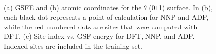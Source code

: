 \documentclass{article}
\begin{document}
\begin{figure}[H]%
\centering%
%
%
\\
%
\caption{(a) GSFE and (b) atomic coordinates for the $\theta$ (0$\overline{1}$1) surface. 
In (b), each black dot represents a point of calculation for NNP and ADP, while the red numbered dots are sites that were computed with DFT.
(c) Site index vs. GSF energy for DFT, NNP, and ADP.
Indexed sites are included in the training set.}
\label{fig:GSF_Theta_0m11}
\end{figure}
\end{document}
